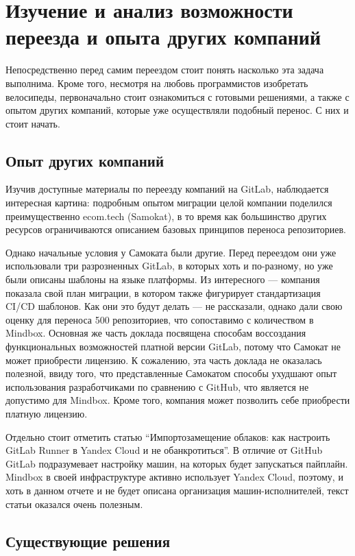 \chapter{Изучение и анализ возможности переезда и опыта других компаний} \label{ch:ch1}
Непосредственно перед самим переездом стоит понять насколько эта задача выполнима.
Кроме того, несмотря на любовь программистов изобретать велосипеды,
первоначально стоит ознакомиться с готовыми решениями, а также с опытом других компаний,
которые уже осуществляли подобный перенос.
С них и стоит начать.


\section{Опыт других компаний}\label{sec:other-companies-expirience}
Изучив доступные материалы по переезду компаний на GitLab,
наблюдается интересная картина: подробным опытом миграции целой компании поделился преимущественно ecom.tech (Samokat),
в то время как большинство других ресурсов ограничиваются описанием базовых принципов переноса репозиториев.

Однако начальные условия у Самоката были другие.
Перед переездом они уже использовали три разрозненных GitLab, в которых хоть и по-разному, но уже были описаны шаблоны на языке платформы.
Из интересного — компания показала свой план миграции, в котором также фигурирует стандартизация CI/CD шаблонов.
Как они это будут делать — не рассказали, однако дали свою оценку для переноса 500 репозиториев, что сопоставимо с количеством в Mindbox.
Основная же часть доклада посвящена способам воссоздания функциональных возможностей платной версии GitLab, потому что
Самокат не может приобрести лицензию.
К сожалению, эта часть доклада не оказалась полезной,
ввиду того, что представленные Самокатом способы ухудшают опыт использования разработчиками по сравнению с GitHub,
что является не допустимо для Mindbox.
Кроме того, компания может позволить себе приобрести платную лицензию.

Отдельно стоит отметить статью \enquote{Импортозамещение облаков: как настроить GitLab Runner в Yandex Cloud и не обанкротиться}.
В отличие от GitHub GitLab подразумевает настройку машин, на которых будет запускаться пайплайн.
Mindbox в своей инфраструктуре активно использует Yandex Cloud, поэтому, и хоть в данном отчете и не будет описана организация машин-исполнителей,
текст статьи оказался очень полезным.

\section{Существующие решения}\label{sec:existing-solutions}
